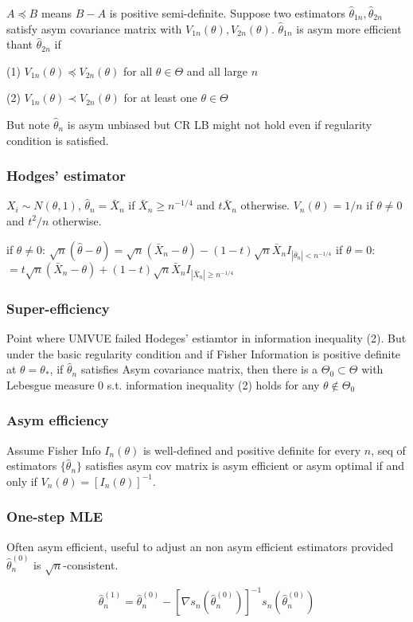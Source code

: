 $A \preccurlyeq B$ means $B-A$ is positive semi-definite. Suppose two estimators $\hat\theta_{1n}, \hat\theta_{2n}$ satisfy asym covariance matrix with $V_{1n}(\theta), V_{2n}(\theta)$. $\hat\theta_{1n}$ is asym more efficient thant $\hat\theta_{2n}$ if

(1) $V_{1n}(\theta) \preccurlyeq V_{2n}(\theta)$ for all $\theta\in\Theta$ and all large $n$

(2) $V_{1n}(\theta) \prec V_{2n}(\theta)$ for at least one $\theta \in \Theta$

But note $\hat\theta_n$ is asym unbiased but CR LB might not hold even if regularity condition is satisfied.

\subsubsection{Hodges' estimator}

$X_i\sim N(\theta, 1)$, $\hat\theta_n=\bar X_n$ if $\bar X_n\geq n^{-1/4}$ and $t\bar X_n$ otherwise. $V_n(\theta)=1/n$ if $\theta\neq0$ and $t^2/n$ otherwise.

if $\theta\neq 0$: $\sqrt{n}(\hat\theta - \theta) = \sqrt{n}(\bar X_n - \theta) - (1-t)\sqrt{n}\bar X_n I_{|\bar\theta_n|<n^{-1/4}}$
if $\theta=0$: $=t\sqrt{n}(\bar X_n - \theta) + (1-t)\sqrt{n}\bar X_n I_{|\bar X_n|\geq n^{-1/4}}$

\subsubsection{Super-efficiency}

Point where UMVUE failed Hodeges' estiamtor in information inequality (2). But under the basic regularity condition and if Fisher Information is positive definite at $\theta=\theta_*$, if $\hat\theta_n$ satisfies Asym covariance matrix, then there is a $\Theta_0\subset\Theta$ with Lebesgue measure $0$ s.t. information inequality (2) holds for any $\theta\notin\Theta_0$

\subsubsection{Asym efficiency}

Assume Fisher Info $I_n(\theta)$ is well-defined and positive definite for every $n$, seq of estimators $\{\hat\theta_n\}$ satisfies asym cov matrix is asym efficient or asym optimal if and only if $V_n(\theta)=[I_n(\theta)]^{-1}$.

\subsubsection{One-step MLE}

Often asym efficient, useful to adjust an non asym efficient estimators provided $\hat\theta_n^{(0)}$ is $\sqrt{n}$-consistent.

$$
\hat\theta_n^{(1)} = \hat\theta_n^{(0)}-\left[\nabla s_n (\hat\theta_n^{(0)})\right]^{-1} s_n(\hat\theta_n^{(0)})
$$